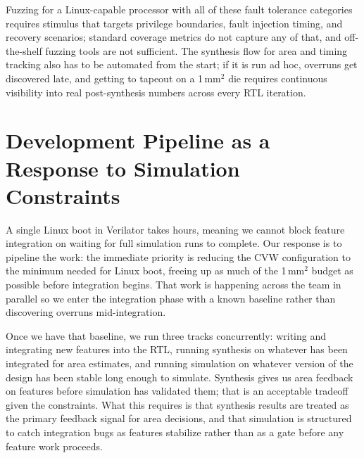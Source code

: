 \documentclass[12pt]{article}
\begin{document}
Fuzzing for a Linux-capable processor with all of these fault tolerance
categories requires stimulus that targets privilege boundaries, fault
injection timing, and recovery scenarios; standard coverage metrics do
not capture any of that, and off-the-shelf fuzzing tools are not
sufficient. The synthesis flow for area and timing tracking also has to
be automated from the start; if it is run ad hoc, overruns get
discovered late, and getting to tapeout on a 1\,mm$^2$ die requires
continuous visibility into real post-synthesis numbers across every RTL
iteration.

\section{Development Pipeline as a Response to Simulation Constraints}

A single Linux boot in Verilator takes hours, meaning we cannot block
feature integration on waiting for full simulation runs to complete.
Our response is to pipeline the work: the immediate priority is reducing
the CVW configuration to the minimum needed for Linux boot, freeing up
as much of the 1\,mm$^2$ budget as possible before integration begins.
That work is happening across the team in parallel so we enter the
integration phase with a known baseline rather than discovering overruns
mid-integration.

Once we have that baseline, we run three tracks concurrently: writing
and integrating new features into the RTL, running synthesis on whatever
has been integrated for area estimates, and running simulation on
whatever version of the design has been stable long enough to simulate.
Synthesis gives us area feedback on features before simulation has
validated them; that is an acceptable tradeoff given the constraints.
What this requires is that synthesis results are treated as the primary
feedback signal for area decisions, and that simulation is structured to
catch integration bugs as features stabilize rather than as a gate
before any feature work proceeds.
\end{document}
